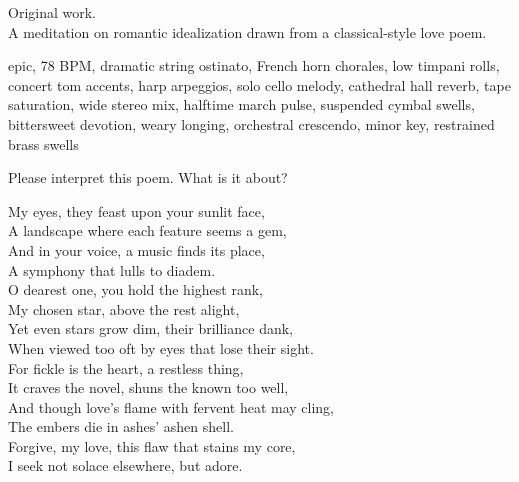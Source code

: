 

\begin{notes}
Original work.\\
A meditation on romantic idealization drawn from a classical-style love poem.
\end{notes}

\begin{style}
epic, 78 BPM, dramatic string ostinato, French horn chorales, low timpani rolls, concert tom accents, harp arpeggios, solo cello melody, cathedral hall reverb, tape saturation, wide stereo mix, halftime march pulse, suspended cymbal swells, bittersweet devotion, weary longing, orchestral crescendo, minor key, restrained brass swells
\end{style}

\begin{lyrics}
Please interpret this poem. %
What is it about?

My eyes, they feast upon your sunlit face,\\
A landscape where each feature seems a gem,\\
And in your voice, a music finds its place,\\
A symphony that lulls to diadem.\\
O dearest one, you hold the highest rank,\\
My chosen star, above the rest alight,\\
Yet even stars grow dim, their brilliance dank,\\
When viewed too oft by eyes that lose their sight.\\
For fickle is the heart, a restless thing,\\
It craves the novel, shuns the known too well,\\
And though love's flame with fervent heat may cling,\\
The embers die in ashes' ashen shell.\\
Forgive, my love, this flaw that stains my core,\\
I seek not solace elsewhere, but adore.

\end{lyrics}

